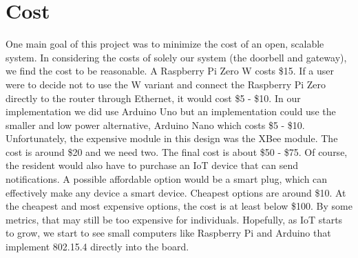 \section{Cost}
One main goal of this project was to minimize the cost of an open, scalable system. In considering the costs of solely our system (the doorbell and gateway), we find the cost to be reasonable. A Raspberry Pi Zero W costs \$15. If a user were  to decide not to use the W variant and connect the Raspberry Pi Zero directly to the router through Ethernet, it would cost \$5 - \$10. In our implementation we did use Arduino Uno but an implementation could use the smaller and low power alternative, Arduino Nano which costs \$5 - \$10. Unfortunately, the expensive module in this design was the XBee module. The cost is around \$20 and we need two. The final cost is about \$50 - \$75. Of course, the resident would also have to purchase an IoT device that can send notifications. A possible affordable option would be a smart plug, which can effectively make any device a smart device. Cheapest options are around \$10. At the cheapest and most expensive options, the cost is at least below \$100. By some metrics, that may still be too expensive for individuals. Hopefully, as IoT starts to grow, we start to see small computers like Raspberry Pi and Arduino that implement 802.15.4 directly into the board.
